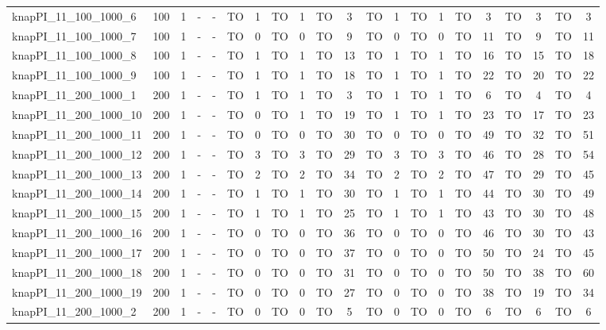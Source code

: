 \begin{sidewaystable}[!ht]
{\begin{tabular}{lcccccccccccccccccccc}
knapPI\_11\_100\_1000\_6 & 100 & 1 &  - &  - & TO & 1 & TO & 1 & TO & 3 & TO & 1 & TO & 1 & TO & 3 & TO & 3 & TO & 3 \\
knapPI\_11\_100\_1000\_7 & 100 & 1 &  - &  - & TO & 0 & TO & 0 & TO & 9 & TO & 0 & TO & 0 & TO & 11 & TO & 9 & TO & 11 \\
knapPI\_11\_100\_1000\_8 & 100 & 1 &  - &  - & TO & 1 & TO & 1 & TO & 13 & TO & 1 & TO & 1 & TO & 16 & TO & 15 & TO & 18 \\
knapPI\_11\_100\_1000\_9 & 100 & 1 &  - &  - & TO & 1 & TO & 1 & TO & 18 & TO & 1 & TO & 1 & TO & 22 & TO & 20 & TO & 22 \\
knapPI\_11\_200\_1000\_1 & 200 & 1 &  - &  - & TO & 1 & TO & 1 & TO & 3 & TO & 1 & TO & 1 & TO & 6 & TO & 4 & TO & 4 \\
knapPI\_11\_200\_1000\_10 & 200 & 1 &  - &  - & TO & 0 & TO & 1 & TO & 19 & TO & 1 & TO & 1 & TO & 23 & TO & 17 & TO & 23 \\
knapPI\_11\_200\_1000\_11 & 200 & 1 &  - &  - & TO & 0 & TO & 0 & TO & 30 & TO & 0 & TO & 0 & TO & 49 & TO & 32 & TO & 51 \\
knapPI\_11\_200\_1000\_12 & 200 & 1 &  - &  - & TO & 3 & TO & 3 & TO & 29 & TO & 3 & TO & 3 & TO & 46 & TO & 28 & TO & 54 \\
knapPI\_11\_200\_1000\_13 & 200 & 1 &  - &  - & TO & 2 & TO & 2 & TO & 34 & TO & 2 & TO & 2 & TO & 47 & TO & 29 & TO & 45 \\
knapPI\_11\_200\_1000\_14 & 200 & 1 &  - &  - & TO & 1 & TO & 1 & TO & 30 & TO & 1 & TO & 1 & TO & 44 & TO & 30 & TO & 49 \\
knapPI\_11\_200\_1000\_15 & 200 & 1 &  - &  - & TO & 1 & TO & 1 & TO & 25 & TO & 1 & TO & 1 & TO & 43 & TO & 30 & TO & 48 \\
knapPI\_11\_200\_1000\_16 & 200 & 1 &  - &  - & TO & 0 & TO & 0 & TO & 36 & TO & 0 & TO & 0 & TO & 46 & TO & 30 & TO & 43 \\
knapPI\_11\_200\_1000\_17 & 200 & 1 &  - &  - & TO & 0 & TO & 0 & TO & 37 & TO & 0 & TO & 0 & TO & 50 & TO & 24 & TO & 45 \\
knapPI\_11\_200\_1000\_18 & 200 & 1 &  - &  - & TO & 0 & TO & 0 & TO & 31 & TO & 0 & TO & 0 & TO & 50 & TO & 38 & TO & 60 \\
knapPI\_11\_200\_1000\_19 & 200 & 1 &  - &  - & TO & 0 & TO & 0 & TO & 27 & TO & 0 & TO & 0 & TO & 38 & TO & 19 & TO & 34 \\
knapPI\_11\_200\_1000\_2 & 200 & 1 &  - &  - & TO & 0 & TO & 0 & TO & 5 & TO & 0 & TO & 0 & TO & 6 & TO & 6 & TO & 6 \\

\end{tabular}}
\end{sidewaystable}
